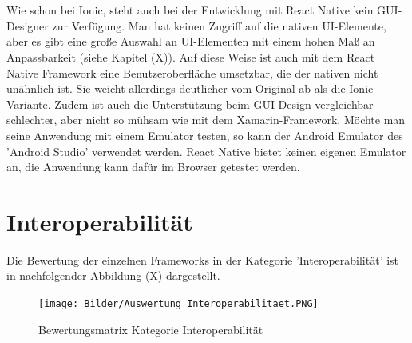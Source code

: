 \\
\\
Wie schon bei Ionic, steht auch bei der Entwicklung mit React Native kein GUI-Designer zur Verfügung. Man hat keinen Zugriff auf die nativen UI-Elemente, aber es gibt eine große Auswahl an UI-Elementen mit einem hohen Maß an Anpassbarkeit (siehe Kapitel (X)). Auf diese Weise ist auch mit dem React Native Framework eine Benutzeroberfläche umsetzbar, die der nativen nicht unähnlich ist. Sie weicht allerdings deutlicher vom Original ab als die Ionic-Variante. Zudem ist auch die Unterstützung beim GUI-Design vergleichbar schlechter, aber nicht so mühsam wie mit dem Xamarin-Framework. Möchte man seine Anwendung mit einem Emulator testen, so kann der Android Emulator des 'Android Studio' verwendet werden. React Native bietet keinen eigenen Emulator an, die Anwendung kann dafür im Browser getestet werden. 

\section{Interoperabilität}

Die Bewertung der einzelnen Frameworks in der Kategorie 'Interoperabilität' ist in nachfolgender Abbildung (X) dargestellt.

\begin{figure}[h]
	\centering
	\texttt{[image: Bilder/Auswertung\_Interoperabilitaet.PNG]}
	\caption{Bewertungsmatrix Kategorie Interoperabilität}
	\label{fig:AuswInterop}
\end{figure}

